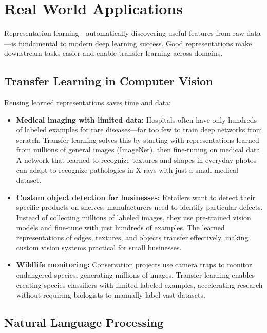 
\section{Real World Applications}
\label{sec:representation-real-world}


Representation learning—automatically discovering useful features from raw data—is fundamental to modern deep learning success. Good representations make downstream tasks easier and enable transfer learning across domains.

\subsection{Transfer Learning in Computer Vision}

Reusing learned representations saves time and data:

\begin{itemize}
    \item \textbf{Medical imaging with limited data:} Hospitals often have only hundreds of labeled examples for rare diseases—far too few to train deep networks from scratch. Transfer learning solves this by starting with representations learned from millions of general images (ImageNet), then fine-tuning on medical data. A network that learned to recognize textures and shapes in everyday photos can adapt to recognize pathologies in X-rays with just a small medical dataset.
    
    \item \textbf{Custom object detection for businesses:} Retailers want to detect their specific products on shelves; manufacturers need to identify particular defects. Instead of collecting millions of labeled images, they use pre-trained vision models and fine-tune with just hundreds of examples. The learned representations of edges, textures, and objects transfer effectively, making custom vision systems practical for small businesses.
    
    \item \textbf{Wildlife monitoring:} Conservation projects use camera traps to monitor endangered species, generating millions of images. Transfer learning enables creating species classifiers with limited labeled examples, accelerating research without requiring biologists to manually label vast datasets.
\end{itemize}

\subsection{Natural Language Processing}

